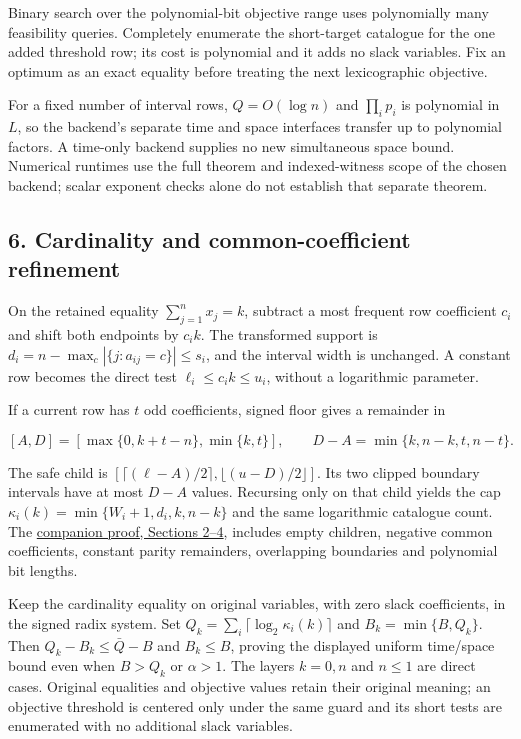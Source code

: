 Binary search over the polynomial-bit objective range uses polynomially many feasibility queries. Completely enumerate the short-target catalogue for the one added threshold row; its cost is polynomial and it adds no slack variables. Fix an optimum as an exact equality before treating the next lexicographic objective.

For a fixed number of interval rows, \(Q=O(\log n)\) and \(\prod_i p_i\) is polynomial in \(L\), so the backend's separate time and space interfaces transfer up to polynomial factors. A time-only backend supplies no new simultaneous space bound. Numerical runtimes use the full theorem and indexed-witness scope of the chosen backend; scalar exponent checks alone do not establish that separate theorem.

\hypertarget{af-c97649ed9d-cardinality-and-common-coefficient-refinement}{%
\subsection{6. Cardinality and common-coefficient refinement}\label{af-c97649ed9d-cardinality-and-common-coefficient-refinement}}

On the retained equality \(\sum_{j=1}^n x_j=k\), subtract a most frequent row coefficient \(c_i\) and shift both endpoints by \(c_i k\). The transformed support is \(d_i=n-\max_c|\{j:a_{ij}=c\}|\le s_i\), and the interval width is unchanged. A constant row becomes the direct test \(\ell_i\le c_i k\le u_i\), without a logarithmic parameter.

If a current row has \(t\) odd coefficients, signed floor gives a remainder in

\[
[A,D]=[\max\{0,k+t-n\},\min\{k,t\}],
\qquad D-A=\min\{k,n-k,t,n-t\}.
\]

The safe child is \([\lceil(\ell-A)/2\rceil,\lfloor(u-D)/2\rfloor]\). Its two clipped boundary intervals have at most \(D-A\) values. Recursing only on that child yields the cap \(\kappa_i(k)=\min\{W_i+1,d_i,k,n-k\}\) and the same logarithmic catalogue count. The \href{https://github.com/icekylinx/algorithm-frontier/blob/main/problems/boolean-linear-compiler/manuscripts/cardinality-and-modal-interval-compilation.md\#2-exact-coefficient-normalization-within-a-layer}{companion proof, Sections 2--4}, includes empty children, negative common coefficients, constant parity remainders, overlapping boundaries and polynomial bit lengths.

Keep the cardinality equality on original variables, with zero slack coefficients, in the signed radix system. Set \(Q_k=\sum_i\lceil\log_2\kappa_i(k)\rceil\) and \(B_k=\min\{B,Q_k\}\). Then \(Q_k-B_k\le\bar Q-B\) and \(B_k\le B\), proving the displayed uniform time/space bound even when \(B>Q_k\) or \(\alpha>1\). The layers \(k=0,n\) and \(n\le1\) are direct cases. Original equalities and objective values retain their original meaning; an objective threshold is centered only under the same guard and its short tests are enumerated with no additional slack variables.


